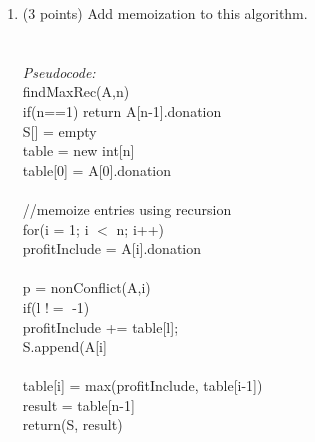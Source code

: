 \documentclass[12pt]{article}
\begin{document}
\begin{enumerate}
\begin{enumerate}
\pagebreak
    \item \label{2c} (3 points) Add memoization to this algorithm.\\
\\
\\ 
 \textit{Pseudocode:} \\
 findMaxRec(A,n)   \\
 \hspace*{10mm} if(n==1) return A[n-1].donation \\
 \hspace*{10mm} S[] = empty \\
 \hspace*{10mm} table = new int[n] \\
 \hspace*{10mm} table[0] = A[0].donation \\  \\
 \hspace*{10mm} //memoize entries using recursion \\
 \hspace*{10mm} for(i = 1; i $<$ n; i++) \\
 \hspace*{15mm} profitInclude = A[i].donation \\ \\
 \hspace*{10mm} p = nonConflict(A,i)\\
 \hspace*{10mm} if(l $!=$ -1) \\
 \hspace*{15mm} profitInclude += table[l];\\
 \hspace*{15mm} S.append(A[i]\\ \\
 \hspace*{10mm} table[i] = max(profitInclude, table[i-1])\\
 result = table[n-1]\\
 return(S, result)\\
 


\end{enumerate}
\end{enumerate}
\end{document}
